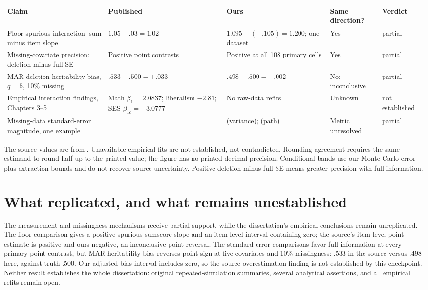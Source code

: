 \begin{center}\small
\begin{tabular}{p{1.65in}p{1.25in}p{1.55in}p{.65in}p{.65in}}
\toprule Claim & Published & Ours & Same direction? & Verdict\\\midrule
Floor spurious interaction: sum minus item slope & $1.05-.03=1.02$ & $1.095-(-.105)=1.200$; one dataset & Yes & partial\\
Missing-covariate precision: deletion minus full SE & Positive point contrasts & Positive at all 108 primary cells & Yes & partial\\
MAR deletion heritability bias, $q=5$, 10\% missing & $.533-.500=+.033$ & $.498-.500=-.002$ & No; inconclusive & partial\\
Empirical interaction findings, Chapters 3--5 & Math $\beta_1=2.0837$; liberalism $-2.81$; SES $\beta_{1c}=-3.0777$ & No raw-data refits & Unknown & not established\\
Missing-data standard-error magnitude, one example & \SourceAse{} & \OursAse{} (variance); \PathAse{} (path) & Metric unresolved & partial\\
\bottomrule
\end{tabular}
\end{center}
\noindent\small The source values are from \citet[Tables 2.1, 3.2, 4.3, 5.4 and Figures 6.3 and 6.5]{schwabe2016}. Unavailable empirical fits are not established, not contradicted. Rounding agreement requires the same estimand to round half up to the printed value; the figure has no printed decimal precision. Conditional bands use our Monte Carlo error plus extraction bounds and do not recover source uncertainty. Positive deletion-minus-full SE means greater precision with full information.\normalsize

\section{What replicated, and what remains unestablished}
The measurement and missingness mechanisms receive partial support, while the dissertation's empirical conclusions remain unreplicated. The floor comparison gives a positive spurious sumscore slope and an item-level interval containing zero; the source's item-level point estimate is positive and ours negative, an inconclusive point reversal. The standard-error comparisons favor full information at every primary point contrast, but MAR heritability bias reverses point sign at five covariates and 10\% missingness: .533 in the source versus .498 here, against truth .500. Our adjusted bias interval includes zero, so the source overestimation finding is not established by this checkpoint. Neither result establishes the whole dissertation: original repeated-simulation summaries, several analytical assertions, and all empirical refits remain open.

